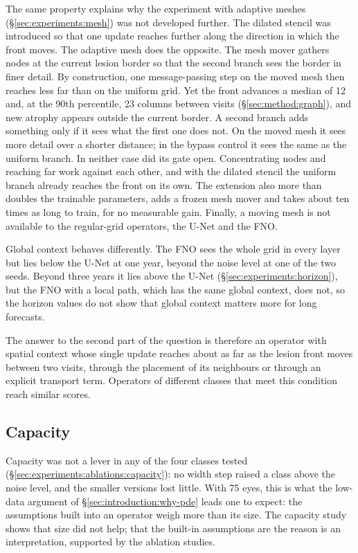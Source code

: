 The same property explains why the experiment with adaptive meshes
(\S\ref{sec:experiments:mesh}) was not developed further. The dilated
stencil was introduced so that one update reaches further along the
direction in which the front moves. The adaptive mesh does the opposite.
The mesh mover gathers nodes at the current lesion border so that the
second branch sees the border in finer detail. By construction, one
message-passing step on the moved mesh then reaches less far than on the
uniform grid. Yet the front advances a median of 12 and, at the 90th
percentile, 23 columns between visits (\S\ref{sec:method:graph}), and new
atrophy appears outside the current border. A second branch adds something
only if it sees what the first one does not. On the moved mesh it sees
more detail over a shorter distance; in the bypass control it sees the
same as the uniform branch. In neither case did its gate open.
Concentrating nodes and reaching far work against each other, and with the
dilated stencil the uniform branch already reaches the front on its own.
The extension also more than doubles the trainable parameters, adds a
frozen mesh mover and takes about ten times as long to train, for no
measurable gain. Finally, a moving mesh is not available to the
regular-grid operators, the U-Net and the FNO.

Global context behaves differently. The FNO sees the whole grid in every
layer but lies below the U-Net at one year, beyond the noise level at one
of the two seeds. Beyond three years it lies above the U-Net
(\S\ref{sec:experiments:horizon}), but the FNO with a local path, which has
the same global context, does not, so the horizon values do not show that
global context matters more for long forecasts.

The answer to the second part of the question is therefore an operator
with spatial context whose single update reaches about as far as the
lesion front moves between two visits, through the placement of its
neighbours or through an explicit transport term. Operators of different
classes that meet this condition reach similar scores.


\subsection{Capacity}
\label{sec:discussion:capacity}

Capacity was not a lever in any of the four classes tested
(\S\ref{sec:experiments:ablations:capacity}): no width step raised a class
above the noise level, and the smaller versions lost little. With 75 eyes, this is what the low-data argument of
\S\ref{sec:introduction:why-pde} leads one to expect: the assumptions built
into an operator weigh more than its size. The capacity study shows that
size did not help; that the built-in assumptions are the reason is an
interpretation, supported by the ablation studies.

